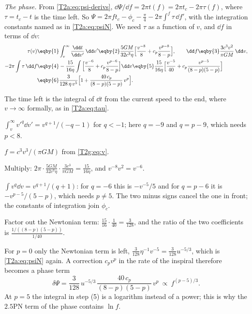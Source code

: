 \emph{The phase.} From \eqref{T2a:eq:psi-derivs}, $\dd\Psi/\dd f=2\pi t(f)=2\pi t_c-2\pi\tau(f)$, where $\tau=t_c-t$ is the time left. So $\Psi=2\pi ft_c-\phi_c-\tfrac\pi4-2\pi\int^f\tau\,\dd f'$, with the integration constants named as in \eqref{T2a:eq:psiN}. We need $\tau$ as a function of $v$, and $\dd f$ in terms of $\dd v$:
\begin{align}
  \tau(v)&\eqby{1}\int_v^\infty\frac{\dd t}{\dd v'}\,\dd v'
  \eqby{2}\frac{5GM}{32c^3\eta}\Big[\frac{v^{-8}}{8}+c_p\frac{v^{p-8}}{8-p}\Big],
  \qquad \dd f\eqby{3}\frac{3c^3v^2}{\pi GM}\,\dd v,\nonumber\\
  -2\pi\int\tau\,\dd f
  &\eqby{4}-\frac{15}{16\eta}\int\Big[\frac{v^{-6}}{8}+c_p\frac{v^{p-6}}{8-p}\Big]\dd v
  \eqby{5}\frac{15}{16\eta}\Big[\frac{v^{-5}}{40}+c_p\frac{v^{p-5}}{(8-p)(5-p)}\Big]\nonumber\\
  &\eqby{6}\frac{3}{128\,\eta\,v^5}\Big[1+\frac{40\,c_p}{(8-p)(5-p)}\,v^p\Big].
  \label{T2g:eq:rule}
\end{align}
\begin{explain}
  \item The time left is the integral of $\dd t$ from the current speed to the end, where $v\to\infty$ formally, as in \eqref{T2a:eq:tau}.
  \item $\int_v^\infty v'^{q}\dd v'=v^{q+1}/(-q-1)$ for $q<-1$; here $q=-9$ and $q=p-9$, which needs $p<8$.
  \item $f=c^3v^3/(\pi GM)$ from \eqref{T2g:eq:v}.
  \item Multiply: $2\pi\cdot\tfrac{5GM}{32c^3\eta}\cdot\tfrac{3c^3}{\pi GM}=\tfrac{15}{16\eta}$, and $v^{-8}v^2=v^{-6}$.
  \item $\int v^{q}\dd v=v^{q+1}/(q+1)$: for $q=-6$ this is $-v^{-5}/5$ and for $q=p-6$ it is $-v^{p-5}/(5-p)$, which needs $p\neq5$. The two minus signs cancel the one in front; the constants of integration join $\phi_c$.
  \item Factor out the Newtonian term: $\tfrac{15}{16}\cdot\tfrac1{40}=\tfrac{3}{128}$, and the ratio of the two coefficients is $\tfrac{1/((8-p)(5-p))}{1/40}$.
\end{explain}
For $p=0$ only the Newtonian term is left, $\tfrac{3}{128}\eta^{-1}v^{-5}=\tfrac3{128}u^{-5/3}$, which is \eqref{T2a:eq:psiN} again. A correction $c_pv^p$ in the rate of the inspiral therefore becomes a phase term
\begin{equation}
  \delta\Psi=\frac{3}{128}\,u^{-5/3}\,\frac{40\,c_p}{(8-p)(5-p)}\,v^p\ \propto\ f^{(p-5)/3}.
  \label{T2g:eq:power-rule}
\end{equation}
At $p=5$ the integral in step (5) is a logarithm instead of a power; this is why the $2.5$PN term of the phase contains $\ln f$.

